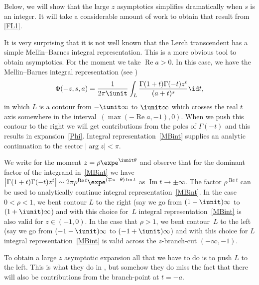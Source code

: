 Below, we will show that the large $z$ asymptotics simplifies dramatically
when $s$ is an integer. It will take a considerable amount of work to
obtain that result from \eqref{FL1}.

It is very surprising that it is not well known that the Lerch transcendent has a simple
Mellin--Barnes integral representation. This is a more obvious tool to obtain asymptotics.
For the moment we take $\operatorname{Re} a>0$. In this case,
we have the Mellin--Barnes integral representation (see \cite[equation~(3.11)]{Srivastava2011})
\begin{equation}\label{MBint}
 \Phi(-z,s,a)=\frac1{2\pi\iunit}\int_L
 \frac{\Gamma(1+t)\Gamma(-t)z^t}{(a+t)^s}\id t,
\end{equation}
in which $L$ is a contour from $-\iunit\infty$ to $\iunit\infty$ which crosses the
real $t$ axis somewhere in the interval~$(\max(-\operatorname{Re} a,-1),0)$. When we push this contour to the
right we will get contributions from the poles of $\Gamma(-t)$ and this results in
expansion~\eqref{Phi}. Integral representation~\eqref{MBint} supplies an
analytic continuation to the sector $|\arg z|<\pi$.

We write for the moment $z=\rho\expe^{\iunit\theta}$ and observe that for the dominant factor
of the integrand in~\eqref{MBint} we have
$\bigl|\Gamma(1+t)\Gamma(-t)z^t\bigr|\sim 2\pi \rho^{\operatorname{Re} t}\expe^{(\mp\pi-\theta)\operatorname{Im} t}$
as $\operatorname{Im} t\to\pm\infty$. The factor $\rho^{\operatorname{Re} t}$ can be used to analytically continue
integral representation~\eqref{MBint}.
In the case $0<\rho<1$, we bent contour $L$ to the right (say we go from $(1-\iunit)\infty$
to $(1+\iunit)\infty$) and with this choice for~$L$ integral representation~\eqref{MBint} is also valid for $z\in(-1,0)$.
In the case that $\rho>1$, we bent contour~$L$ to the
left (say we go from $(-1-\iunit)\infty$ to $(-1+\iunit)\infty$) and
with this choice for $L$ integral representation~\eqref{MBint}
is valid across the $z$-branch-cut $(-\infty,-1)$.

To obtain a large $z$ asymptotic expansion all that we have to do is to push $L$ to the
left. This is what they do in \cite{Srivastava2011}, but somehow they do miss the fact
that there will also be contributions from the branch-point at $t=-a$.


